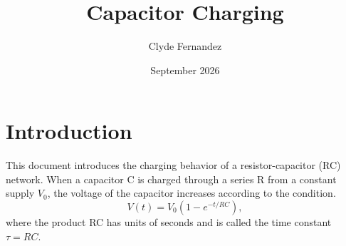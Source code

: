 \documentclass{article}
\title{Capacitor Charging}
\author{Clyde Fernandez}
\date{September 2026}
\begin{document}
\maketitle

\section{Introduction}
This document introduces the charging behavior of a resistor-capacitor (RC) network. When a capacitor C is charged through a series R from a constant supply $V_0$, the voltage of the capacitor increases according to the condition.
\[V(t) = V_0 \left(1-e^{-t/RC}\right),\]
where the product RC has units of seconds and is called the time constant $\tau = RC$.
\end{document}
